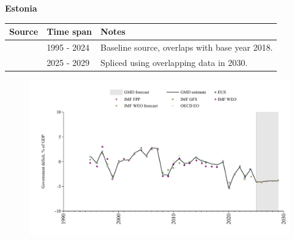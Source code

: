 \documentclass[12pt,a4paper,landscape]{article}
\begin{document}
\begin{adjustbox}{max totalsize={\paperwidth}{\paperheight},center}
\begin{minipage}[t][\textheight][t]{\textwidth}
\vspace*{0.5cm}
{}
\begin{center}
{\Large\bfseries Estonia}
\end{center}
\vspace{0.5cm}
\begin{table}[H]
\centering
\small
\begin{tabular}{|l|l|l|}
\hline
\textbf{Source} & \textbf{Time span} & \textbf{Notes} \\
\hline
\rowcolor{white}\cite{EUS}& 1995 - 2024 &Baseline source, overlaps with base year 2018.\\
\rowcolor{lightgray}\cite{IMF_WEO_forecast}& 2025 - 2029 &Spliced using overlapping data in 2030.\\
\hline
\end{tabular}
\end{table}
\begin{figure}[H]
\centering
\includegraphics[width=\textwidth,height=0.6\textheight,keepaspectratio]{graphs/EST_govdef_GDP.pdf}
\end{figure}
\end{minipage}
\end{adjustbox}
\end{document}
